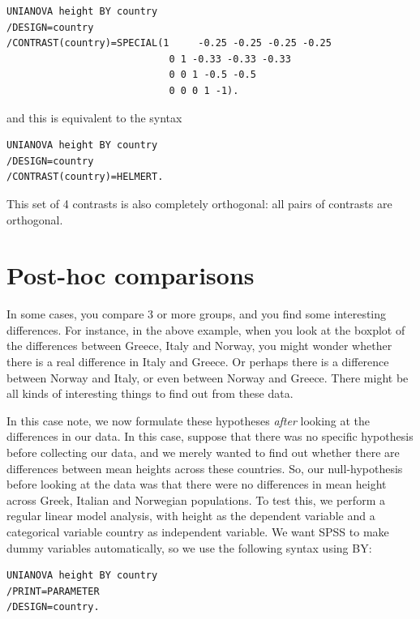 \documentclass[]{book}\usepackage[]{graphicx}\usepackage[]{color}
\begin{document}
\begin{verbatim}
UNIANOVA height BY country
/DESIGN=country
/CONTRAST(country)=SPECIAL(1     -0.25 -0.25 -0.25 -0.25
                            0 1 -0.33 -0.33 -0.33
                            0 0 1 -0.5 -0.5
                            0 0 0 1 -1).
\end{verbatim}

and this is equivalent to the syntax 

\begin{verbatim}
UNIANOVA height BY country
/DESIGN=country
/CONTRAST(country)=HELMERT.
\end{verbatim}


This set of 4 contrasts is also completely orthogonal: all pairs of contrasts are orthogonal.





\section{Post-hoc comparisons}

In some cases, you compare 3 or more groups, and you find some interesting differences. For instance, in the above example, when you look at the boxplot of the  differences between Greece, Italy and Norway, you might wonder whether there is a real difference in Italy and Greece. Or perhaps there is a difference between Norway and Italy, or even between Norway and Greece. There might be all kinds of interesting things to find out from these data.

In this case note, we now formulate these hypotheses \textit{after} looking at the differences in our data. In this case, suppose that there was no specific hypothesis before collecting our data, and we merely wanted to find out whether there are differences between mean heights across these countries. So, our null-hypothesis before looking at the data was that there were no differences in mean height across Greek, Italian and Norwegian populations. To test this, we perform a regular linear model analysis, with height as the dependent variable and a categorical variable country as independent variable. We want SPSS to make dummy variables automatically, so we use the following syntax using BY:

\begin{verbatim}
UNIANOVA height BY country
/PRINT=PARAMETER
/DESIGN=country.
\end{verbatim}
\end{document}
